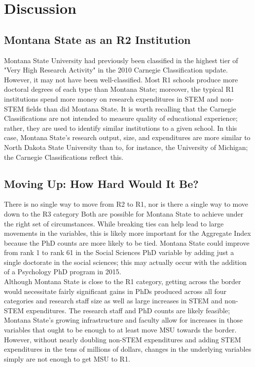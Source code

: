 \documentclass{article}
\begin{document}
  \pagebreak
\section{Discussion}
  \subsection{Montana State as an R2 Institution}
  Montana State University had previously been classified in the highest tier of "Very High Research Activity" in the 2010 Carnegie Classification update. However, it may not have been well-classified. Most R1 schools produce more doctoral degrees of each type than Montana State; moreover, the typical R1 institutions spend more money on research expenditures in STEM and non-STEM fields than did Montana State.  It is worth recalling that the Carnegie Classifications are not intended to measure quality of educational experience; rather, they are used to identify similar institutions to a given school. In this case, Montana State's research output, size, and expenditures are more similar to North Dakota State University than to, for instance, the University of Michigan; the Carnegie Classifications reflect this. 
  
  
  \subsection{Moving Up: How Hard Would It Be?}
  There is no single way to move from R2 to R1, nor is there a single way to move down to the R3 category Both are possible for Montana State to achieve under the right set of circumstances. While breaking ties can help lead to large movements in the variables, this is likely more important for the Aggregate Index because the PhD counts are more likely to be tied. Montana State could improve from rank 1 to rank 61 in the Social Sciences PhD variable by adding just a single doctorate in the social sciences; this may actually occur with the addition of a Psychology PhD program in 2015.\\ 
  Although Montana State is close to the R1 category, getting across the border would necessitate fairly significant gains in PhDs produced across all four categories and research staff size as well as large increases in STEM and non-STEM expenditures.  The research staff and PhD counts are likely feasible; Montana State's growing infrastructure and faculty allow for increases in those variables that ought to be enough to at least move MSU towards the border. However, without nearly doubling non-STEM expenditures and adding STEM expenditures in the tens of millions of dollars, changes in the underlying variables simply are not enough to get MSU to R1. 
  
\end{document}
